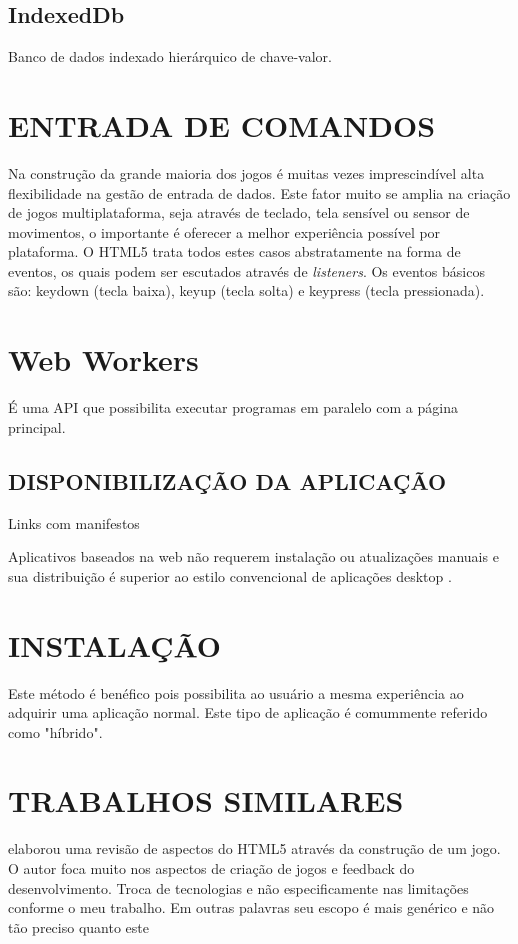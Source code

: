 \subsection{IndexedDb}

Banco de dados indexado hierárquico de chave-valor.

\section{ENTRADA DE COMANDOS}

Na construção da grande maioria dos jogos é muitas vezes
imprescindível alta flexibilidade na gestão de entrada de dados.
Este fator muito se amplia na criação de jogos multiplataforma,
seja através de teclado, tela sensível ou sensor de movimentos, o
importante é oferecer a melhor experiência possível por plataforma.
O HTML5 trata todos estes casos abstratamente na forma de eventos, os
quais podem ser escutados através de \textit{listeners}. Os eventos
básicos são: keydown (tecla baixa), keyup (tecla solta) e keypress
(tecla pressionada).

\section{Web Workers}

É uma API que possibilita executar programas em paralelo com a página principal.

\subsection{DISPONIBILIZAÇÃO DA APLICAÇÃO}

Links com manifestos

Aplicativos baseados na web não requerem instalação ou atualizações
manuais e sua distribuição é superior ao estilo convencional de
aplicações desktop \autocite{browserGamesTechnologyAndFuture}.

\section{INSTALAÇÃO}
Este método é benéfico pois possibilita ao usuário a mesma
experiência ao adquirir uma aplicação normal. Este tipo de
aplicação é comummente referido como "híbrido".

\section{TRABALHOS SIMILARES}

\cite{crossPlatformMobileGame} elaborou uma revisão de aspectos do
HTML5 através da construção de um jogo. O autor foca muito nos
aspectos de criação de jogos e feedback do desenvolvimento. Troca
de tecnologias e não especificamente nas limitações conforme o meu
trabalho. Em outras palavras seu escopo é mais genérico e não tão
preciso quanto este

